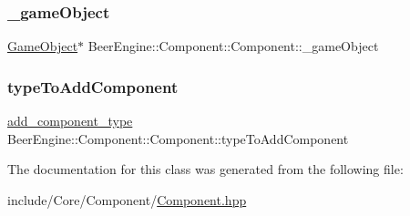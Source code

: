 \subsubsection{\texorpdfstring{\+\_\+game\+Object}{\_gameObject}}
{\footnotesize\ttfamily \mbox{\hyperlink{class_beer_engine_1_1_game_object}{Game\+Object}}$\ast$ Beer\+Engine\+::\+Component\+::\+Component\+::\+\_\+game\+Object}

\mbox{\label{class_beer_engine_1_1_component_1_1_component_ae2a965d0f01f9bca16e5159f00a4f76e}} 
\subsubsection{\texorpdfstring{type\+To\+Add\+Component}{typeToAddComponent}}
{\footnotesize\ttfamily \mbox{\hyperlink{namespace_beer_engine_1_1_component_a58109916ff3e951c90c1dcd5ebba359b}{add\+\_\+component\+\_\+type}} Beer\+Engine\+::\+Component\+::\+Component\+::type\+To\+Add\+Component\hspace{0.3cm}{\ttfamily [static]}}



The documentation for this class was generated from the following file\+:\begin{DoxyCompactItemize}
\item 
include/\+Core/\+Component/\mbox{\hyperlink{_component_8hpp}{Component.\+hpp}}\end{DoxyCompactItemize}
